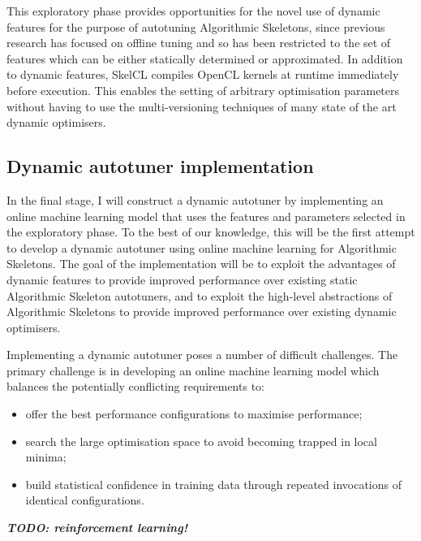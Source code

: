 This exploratory phase provides opportunities for the novel use of
dynamic features for the purpose of autotuning Algorithmic Skeletons,
since previous research has focused on offline tuning and so has been
restricted to the set of features which can be either statically
determined or approximated. In addition to dynamic features, SkelCL
compiles OpenCL kernels at runtime immediately before execution. This
enables the setting of arbitrary optimisation parameters without
having to use the multi-versioning techniques of many state of the art
dynamic optimisers.

\subsection{Dynamic autotuner implementation}
In the final stage, I will construct a dynamic autotuner by
implementing an online machine learning model that uses the features
and parameters selected in the exploratory phase. To the best of our
knowledge, this will be the first attempt to develop a dynamic
autotuner using online machine learning for Algorithmic Skeletons. The
goal of the implementation will be to exploit the advantages of
dynamic features to provide improved performance over existing static
Algorithmic Skeleton autotuners, and to exploit the high-level
abstractions of Algorithmic Skeletons to provide improved performance
over existing dynamic optimisers.

Implementing a dynamic autotuner poses a number of difficult
challenges. The primary challenge is in developing an online machine
learning model which balances the potentially conflicting requirements
to:

\begin{itemize}
\item offer the best performance configurations to maximise
  performance;
\item search the large optimisation space to avoid becoming trapped in
  local minima;
\item build statistical confidence in training data through repeated
  invocations of identical configurations.
\end{itemize}

\noindent
\textbf{\textit{TODO: reinforcement learning!}}


